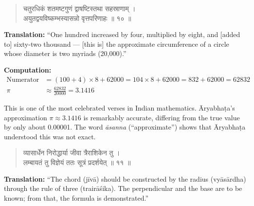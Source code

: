 \documentclass[11pt,a4paper]{article}
\newcommand{\dev}[1]{{\devanagarifont #1}}
\newenvironment{sanskritverse}{\begin{verse}\devanagarifont\large\centering}{\end{verse}}
\begin{document}
\vspace{0.5cm}

\begin{tcolorbox}[colback=gray!10,colframe=titlecolor,title={\dev{\textbf{गणित १० — वृत्तपरिधिसूत्रम् (The Value of $\pi$) — FAMOUS VERSE}}}]
\begin{sanskritverse}
\dev{चतुरधिकं शतमष्टगुणं द्वाषष्टिस्तथा सहस्राणाम् ।\\
अयुतद्वयविष्कम्भस्यासन्नो वृत्तपरिणाहः ॥ १० ॥}
\end{sanskritverse}
\end{tcolorbox}

\vspace{0.3cm}
\noindent\textbf{Translation:} ``One hundred increased by four, multiplied by eight, and [added to] sixty-two thousand --- [this is] the approximate circumference of a circle whose diameter is two myriads (20,000).''

\smallskip
\noindent\textbf{Computation:}
\begin{align*}
\text{Numerator} &= (100 + 4) \times 8 + 62000 = 104 \times 8 + 62000 = 832 + 62000 = 62832 \\
\pi &\approx \frac{62832}{20000} = 3.1416
\end{align*}

\noindent This is one of the most celebrated verses in Indian mathematics. Āryabhaṭa's approximation $\pi \approx 3.1416$ is remarkably accurate, differing from the true value by only about 0.00001. The word \textit{āsanna} (``approximate'') shows that Āryabhaṭa understood this was not exact.

\vspace{0.5cm}

\begin{tcolorbox}[colback=white,colframe=rulecolor,title={\dev{\textbf{गणित ११ — जीवाविनिर्माणम् (Chord Construction)}}}]
\begin{sanskritverse}
\dev{व्यासार्धेन निरोद्धार्या जीवा त्रैराशिकेन तु ।\\
लम्बायतं तु विज्ञेयं ततः सूत्रं प्रदर्शयेत् ॥ ११ ॥}
\end{sanskritverse}
\end{tcolorbox}

\vspace{0.3cm}
\noindent\textbf{Translation:} ``The chord (jīvā) should be constructed by the radius (vyāsārdha) through the rule of three (trairāśika). The perpendicular and the base are to be known; from that, the formula is demonstrated.''
\end{document}
